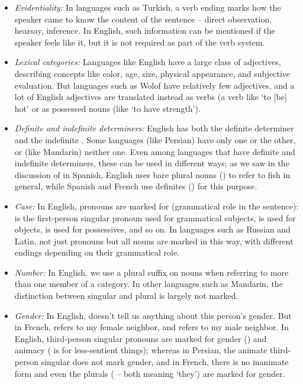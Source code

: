 \begin{itemize}
\item \emph{Evidentiality:}  In languages such as Turkish, a verb ending marks how the speaker came to know the content of the sentence -- direct observation, hearsay, inference.  In English, such information can be mentioned if the speaker feels like it, but it is not required as part of the verb system.

\item \emph{Lexical categories:} Languages like English have a large class of adjectives, describing concepts like color, age, size, physical appearance, and subjective evaluation. But languages such as Wolof have relatively few adjectives, and a lot of English adjectives are translated instead as verbs (a verb like `to [be] hot' or as possessed nouns (like `to have strength').


\item \emph{Definite and indefinite determiners:} English has both the definite determiner  and the indefinite .  Some languages (like Persian) have only one or the other, or (like Mandarin) neither one.  Even among languages that have definite and indefinite determiners, these can be used in different ways; as we saw in the discussion of  in Spanish, English uses bare plural nouns () to refer to fish in general, while Spanish and French use definites () for this purpose.

\item \emph{Case:}  In English, pronouns are marked for   (grammatical role in the sentence):  is the first-person singular pronoun used for grammatical subjects,  is used for objects,  is used for possessives, and so on.  In languages such as Russian and Latin, not just pronouns but all nouns are marked in this way, with different endings depending on their grammatical role.

\item \emph{Number:} In English, we use a plural  suffix on nouns when referring to more than one member of a category.  In other languages such as Mandarin, the distinction between singular and plural is largely not marked.

\item \emph{Gender:} In English,  doesn't tell us anything about this person's gender.  But in French,  refers to my female neighbor, and  refers to my male neighbor.   In English,  third-person singular pronouns are marked for gender () and animacy ( is for less-sentient things); whereas in Persian, the animate third-person singular  does not mark gender, and in French, there is no inanimate form and even the plurals ( -- both meaning `they') are marked for gender. 



\end{itemize}
